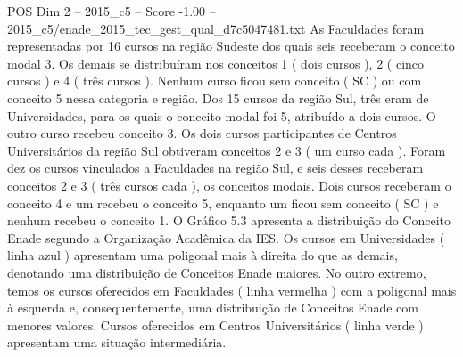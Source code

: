 \begin{textsample}{POS Dim 2 – 2015\_c5 – Score -1.00 – 2015\_c5/enade\_2015\_tec\_gest\_qual\_d7c5047481.txt}
As Faculdades foram representadas por 16 cursos na região Sudeste dos quais seis receberam o conceito modal 3.
Os demais se distribuíram nos conceitos 1 ( dois cursos ), 2 ( cinco cursos ) e 4 ( três cursos ).
Nenhum curso ficou sem conceito ( SC ) ou com conceito 5 nessa categoria e região.
Dos 15 cursos da região Sul, três eram de Universidades, para os quais o conceito modal foi 5, atribuído a dois cursos.
O outro curso recebeu conceito 3.
Os dois cursos participantes de Centros Universitários da região Sul obtiveram conceitos 2 e 3 ( um curso cada ).
Foram dez os cursos vinculados a Faculdades na região Sul, e seis desses receberam conceitos 2 e 3 ( três cursos cada ), os conceitos modais.
Dois cursos receberam o conceito 4 e um recebeu o conceito 5, enquanto um ficou sem conceito ( SC ) e nenhum recebeu o conceito 1.
O Gráfico 5.3 apresenta a distribuição do Conceito Enade segundo a Organização Acadêmica da IES.
Os cursos em Universidades ( linha azul ) apresentam uma poligonal mais à direita do que as demais, denotando uma distribuição de Conceitos Enade maiores.
No outro extremo, temos os cursos oferecidos em Faculdades ( linha vermelha ) com a poligonal mais à esquerda e, consequentemente, uma distribuição de Conceitos Enade com menores valores.
Cursos oferecidos em Centros Universitários ( linha verde ) apresentam uma situação intermediária.

\end{textsample}
